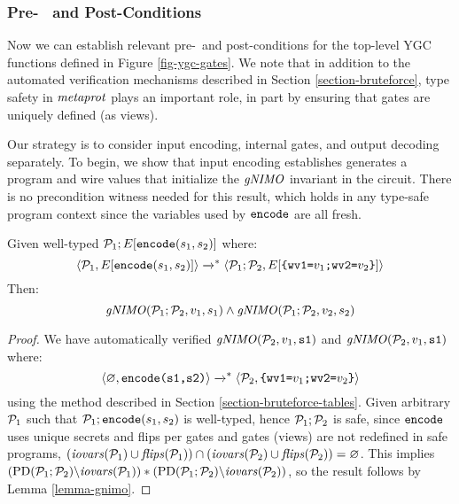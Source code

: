 \subsubsection{Pre-~ and Post-Conditions}
\label{section-pre-post}
Now we can establish relevant pre-~and post-conditions for the
top-level YGC functions defined in Figure \ref{fig-ygc-gates}. We note
that in addition to the automated verification mechanisms described in
Section \ref{section-bruteforce}, type safety in $\mathit{metaprot}$ plays an
important role, in part by ensuring that gates are uniquely defined
(as views).

Our strategy is to consider input encoding, internal gates, and
output decoding separately. To begin, we show that input encoding
establishes generates a program and wire values that initialize
the $\mathit{gNIMO}$ invariant in the circuit. There is no precondition
witness needed for this result, which holds in any type-safe
program context since the variables used by $\texttt{encode}$
are all fresh. 
\begin{lemma}
  \label{lemma-encode}
  Given well-typed $\mathcal{P}_1;E[\texttt{encode}(s_1,s_2)]$ where:
  $$
  \langle \mathcal{P}_1,E[\texttt{encode}(s_1,s_2)] \rangle \xrightarrow{}^{*}
  \langle \mathcal{P}_1;\mathcal{P}_2,E[\texttt{\{wv1=}v_1\texttt{;wv2=}v_2\texttt{\}}] \rangle
  $$
  Then:
  $$\mathit{gNIMO}(\mathcal{P}_1;\mathcal{P}_2,v_1,s_1) \wedge \mathit{gNIMO}(\mathcal{P}_1;\mathcal{P}_2,v_2,s_2)$$
\end{lemma}

\begin{proof}
  We have automatically verified
  $\mathit{gNIMO}(\mathcal{P}_2,v_1,\texttt{s1})$ and $\mathit{gNIMO}(\mathcal{P}_2,v_1,\texttt{s1})$
  where:
  $$
  \langle \varnothing,\texttt{encode(s1,s2)} \rangle \xrightarrow{}^{*}
  \langle \mathcal{P}_2,\texttt{\{wv1=}v_1\texttt{;wv2=}v_2\texttt{\}} \rangle
  $$
  using the method described in Section \ref{section-bruteforce-tables}.
  Given arbitrary $\mathcal{P}_1$ such that $\mathcal{P}_1;\texttt{encode}(s_1,s_2)$
  is well-typed, hence $\mathcal{P}_1;\mathcal{P}_2$ is safe, 
  since $\texttt{encode}$ uses unique secrets and flips per gates and
  gates (views) are not redefined in safe programs,
  $(\mathit{iovars}(\mathcal{P}_1) \cup \mathit{flips}(\mathcal{P}_1)) \cap (\mathit{iovars}(\mathcal{P}_2) \cup
  \mathit{flips}(\mathcal{P}_2)) = \varnothing$. This implies 
  $(\mathrm{PD}(\mathcal{P}_1;\mathcal{P}_2)\backslash\mathit{iovars}(\mathcal{P}_1)) *
  (\mathrm{PD}(\mathcal{P}_1;\mathcal{P}_2)\backslash\mathit{iovars}(\mathcal{P}_2))$, so the result follows
  by Lemma \ref{lemma-gnimo}.
\end{proof}


